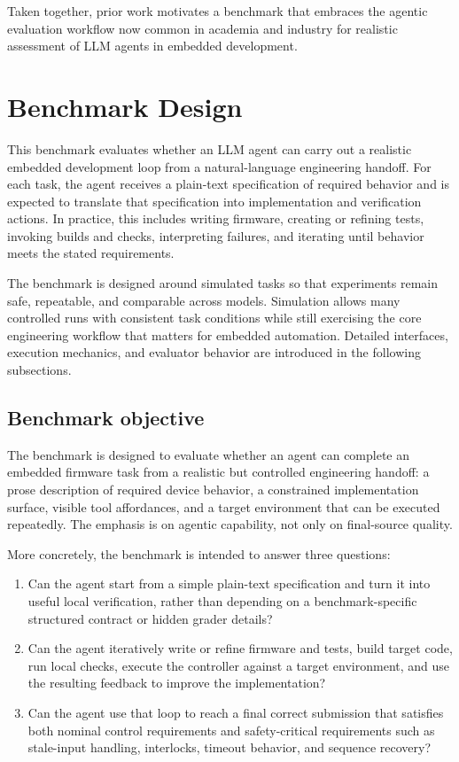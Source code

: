 \documentclass[a4paper,fleqn]{cas-dc}
\begin{document}
Taken together, prior work motivates a benchmark that embraces the agentic evaluation workflow now common in academia and industry for realistic assessment of LLM agents in embedded development.

\section{Benchmark Design}
\label{sec:benchmark}

This benchmark evaluates whether an LLM agent can carry out a realistic embedded development loop from a natural-language engineering handoff. For each task, the agent receives a plain-text specification of required behavior and is expected to translate that specification into implementation and verification actions. In practice, this includes writing firmware, creating or refining tests, invoking builds and checks, interpreting failures, and iterating until behavior meets the stated requirements.

The benchmark is designed around simulated tasks so that experiments remain safe, repeatable, and comparable across models. Simulation allows many controlled runs with consistent task conditions while still exercising the core engineering workflow that matters for embedded automation. Detailed interfaces, execution mechanics, and evaluator behavior are introduced in the following subsections.

\subsection{Benchmark objective}

The benchmark is designed to evaluate whether an agent can complete an embedded firmware task from a realistic but controlled engineering handoff: a prose description of required device behavior, a constrained implementation surface, visible tool affordances, and a target environment that can be executed repeatedly. The emphasis is on agentic capability, not only on final-source quality.

More concretely, the benchmark is intended to answer three questions:

\begin{enumerate}
    \item Can the agent start from a simple plain-text specification and turn it into useful local verification, rather than depending on a benchmark-specific structured contract or hidden grader details?
    \item Can the agent iteratively write or refine firmware and tests, build target code, run local checks, execute the controller against a target environment, and use the resulting feedback to improve the implementation?
    \item Can the agent use that loop to reach a final correct submission that satisfies both nominal control requirements and safety-critical requirements such as stale-input handling, interlocks, timeout behavior, and sequence recovery?
\end{enumerate}
\end{document}
